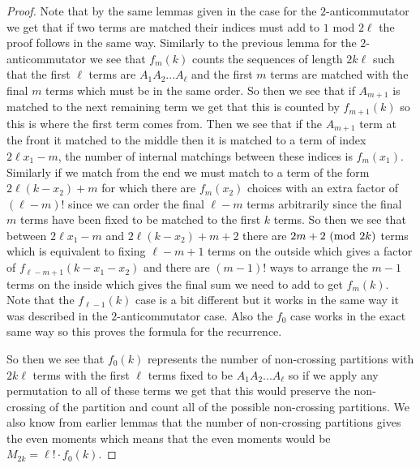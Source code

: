 \documentclass[12pt,reqno]{amsart}
\theoremstyle{plain} %
\theoremstyle{remark}
\theoremstyle{definition}
\renewcommand{\mod}[1]{\textup{ (mod~$#1$)}}
\begin{document}
\begin{proof}
Note that by the same lemmas given in the case for the $2$-anticommutator we get that if two terms are matched their indices must add to $1$ mod $2\ell$ the proof follows in the same way. Similarly to the previous lemma for the $2$-anticommutator we see that $f_m(k)$ counts the sequences of length $2k\ell$ such that the first $\ell$ terms are $A_1A_2...A_\ell$ and the first $m$ terms are matched with the final $m$ terms which must be in the same order. So then we see that if $A_{m+1}$ is matched to the next remaining term we get that this is counted by $f_{m+1}(k)$ so this is where the first term comes from. Then we see that if the $A_{m+1}$ term at the front it matched to the middle then it is matched to a term of index $2\ell x_1-m$, the number of internal matchings between these indices is $f_m(x_1)$. Similarly if we match from the end we must match to a term of the form $2\ell (k-x_2)+m$ for which there are $f_m(x_2)$ choices with an extra factor of $(\ell-m)!$ since we can order the final $\ell-m$ terms arbitrarily since the final $m$ terms have been fixed to be matched to the first $k$ terms. So then we see that between $2\ell x_1-m$ and $2\ell (k-x_2)+m+2$ there are $2m+2 \mod{2k}$ terms which is equivalent to fixing $\ell-m + 1$ terms on the outside which gives a factor of $f_{\ell-m+1}(k-x_1-x_2)$ and there are $(m-1)!$ ways to arrange the $m-1$ terms on the inside which gives the final sum we need to add to get $f_m(k)$. Note that the $f_{\ell-1}(k)$ case is a bit different but it works in the same way it was described in the $2$-anticommutator case. Also the $f_0$ case works in the exact same way so this proves the formula for the recurrence.

So then we see that $f_0(k)$ represents the number of non-crossing partitions with $2k\ell$ terms with the first $\ell$ terms fixed to be $A_1A_2...A_\ell$ so if we apply any permutation to all of these terms we get that this would preserve the non-crossing of the partition and count all of the possible non-crossing partitions. We also know from earlier lemmas that the number of non-crossing partitions gives the even moments which means that the even moments would be $M_{2k}=\ell! \cdot f_0(k)$.
\end{proof}
\end{document}
